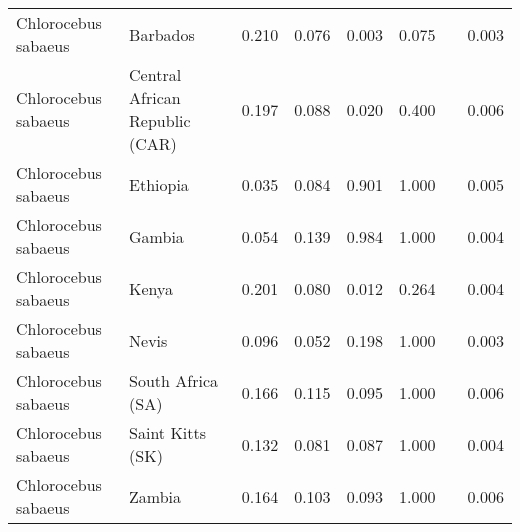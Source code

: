 \begin{center}
\begin{adjustbox}{width = 1\textwidth}
\begin{tabular}{|l|l|r|r|r|r|r|}
 Chlorocebus sabaeus &                        Barbados &                                              0.210 &                                              0.076 &                0.003 &                                  0.075~~ &              0.003 \\
 Chlorocebus sabaeus &  Central African Republic (CAR) &                                              0.197 &                                              0.088 &                0.020 &                                  0.400~~ &              0.006 \\
 Chlorocebus sabaeus &                        Ethiopia &                                              0.035 &                                              0.084 &                0.901 &                                  1.000~~ &              0.005 \\
 Chlorocebus sabaeus &                          Gambia &                                              0.054 &                                              0.139 &                0.984 &                                  1.000~~ &              0.004 \\
 Chlorocebus sabaeus &                           Kenya &                                              0.201 &                                              0.080 &                0.012 &                                  0.264~~ &              0.004 \\
 Chlorocebus sabaeus &                           Nevis &                                              0.096 &                                              0.052 &                0.198 &                                  1.000~~ &              0.003 \\
 Chlorocebus sabaeus &               South Africa (SA) &                                              0.166 &                                              0.115 &                0.095 &                                  1.000~~ &              0.006 \\
 Chlorocebus sabaeus &                Saint Kitts (SK) &                                              0.132 &                                              0.081 &                0.087 &                                  1.000~~ &              0.004 \\
 Chlorocebus sabaeus &                          Zambia &                                              0.164 &                                              0.103 &                0.093 &                                  1.000~~ &              0.006 \\

\end{tabular}
\end{adjustbox}
\end{center}
